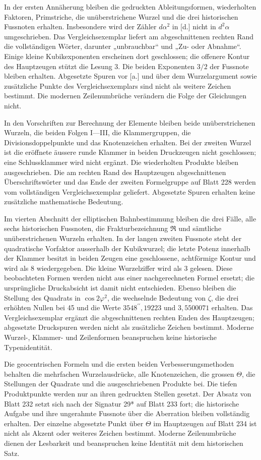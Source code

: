 In der ersten Annäherung bleiben die gedruckten Ableitungsformen, wiederholten Faktoren, Primstriche, die unüberstrichene Wurzel und die drei historischen Fussnoten erhalten. Insbesondere wird der Zähler $d\alpha^2$ in [d.] nicht in $d^2\alpha$ umgeschrieben. Das Vergleichsexemplar liefert am abgeschnittenen rechten Rand die vollständigen Wörter, darunter „unbrauchbar“ und „Zu- oder Abnahme“. Einige kleine Kubikexponenten erscheinen dort geschlossen; die offenere Kontur des Hauptzeugen stützt die Lesung 3. Die beiden Exponenten $3/2$ der Fussnote bleiben erhalten. Abgesetzte Spuren vor [a.] und über dem Wurzelargument sowie zusätzliche Punkte des Vergleichsexemplars sind nicht als weitere Zeichen bestimmt. Die modernen Zeilenumbrüche verändern die Folge der Gleichungen nicht.

In den Vorschriften zur Berechnung der Elemente bleiben beide unüberstrichenen Wurzeln, die beiden Folgen I—III, die Klammergruppen, die Divisionsdoppelpunkte und das Knotenzeichen erhalten. Bei der zweiten Wurzel ist die eröffnete äussere runde Klammer in beiden Druckzeugen nicht geschlossen; eine Schlussklammer wird nicht ergänzt. Die wiederholten Produkte bleiben ausgeschrieben. Die am rechten Rand des Hauptzeugen abgeschnittenen Überschriftswörter und das Ende der zweiten Formelgruppe auf Blatt 228 werden vom vollständigen Vergleichsexemplar geliefert. Abgesetzte Spuren erhalten keine zusätzliche mathematische Bedeutung.

Im vierten Abschnitt der elliptischen Bahnbestimmung bleiben die drei Fälle, alle sechs historischen Fussnoten, die Frakturbezeichnung $\mathfrak{R}$ und sämtliche unüberstrichenen Wurzeln erhalten. In der langen zweiten Fussnote steht der quadratische Vorfaktor ausserhalb der Kubikwurzel; die letzte Potenz innerhalb der Klammer besitzt in beiden Zeugen eine geschlossene, achtförmige Kontur und wird als 8 wiedergegeben. Die kleine Wurzelziffer wird als 3 gelesen. Diese beobachteten Formen werden nicht aus einer nachgerechneten Formel ersetzt; die ursprüngliche Druckabsicht ist damit nicht entschieden. Ebenso bleiben die Stellung des Quadrats in $\cos2\varphi^2$, die wechselnde Bedeutung von $\zeta$, die drei erhöhten Nullen bei 45 und die Werte $3548^{\prime\prime}{,}19223$ und $3{,}5500071$ erhalten. Das Vergleichsexemplar ergänzt die abgeschnittenen rechten Enden des Hauptzeugen; abgesetzte Druckspuren werden nicht als zusätzliche Zeichen bestimmt. Moderne Wurzel-, Klammer- und Zeilenformen beanspruchen keine historische Typenidentität.

Die geocentrischen Formeln und die ersten beiden Verbesserungsmethoden behalten die mehrfachen Wurzelausdrücke, alle Knotenzeichen, die grossen $\Theta$, die Stellungen der Quadrate und die ausgeschriebenen Produkte bei. Die tiefen Produktpunkte werden nur an ihren gedruckten Stellen gesetzt. Der Absatz von Blatt 232 setzt sich nach der Signatur 29* auf Blatt 233 fort; die historische Aufgabe und ihre ungerahmte Fussnote über die Aberration bleiben vollständig erhalten. Der einzelne abgesetzte Punkt über $\Theta$ im Hauptzeugen auf Blatt 234 ist nicht als Akzent oder weiteres Zeichen bestimmt. Moderne Zeilenumbrüche dienen der Lesbarkeit und beanspruchen keine Identität mit dem historischen Satz.


